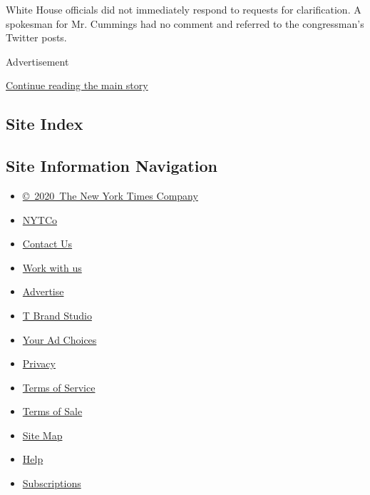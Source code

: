 White House officials did not immediately respond to requests for
clarification. A spokesman for Mr. Cummings had no comment and referred
to the congressman's Twitter posts.

Advertisement

\protect\hyperlink{after-bottom}{Continue reading the main story}

\hypertarget{site-index}{%
\subsection{Site Index}\label{site-index}}

\hypertarget{site-information-navigation}{%
\subsection{Site Information
Navigation}\label{site-information-navigation}}

\begin{itemize}
\tightlist
\item
  \href{https://help.nytimes3xbfgragh.onion/hc/en-us/articles/115014792127-Copyright-notice}{©~2020~The
  New York Times Company}
\end{itemize}

\begin{itemize}
\tightlist
\item
  \href{https://www.nytco.com/}{NYTCo}
\item
  \href{https://help.nytimes3xbfgragh.onion/hc/en-us/articles/115015385887-Contact-Us}{Contact
  Us}
\item
  \href{https://www.nytco.com/careers/}{Work with us}
\item
  \href{https://nytmediakit.com/}{Advertise}
\item
  \href{http://www.tbrandstudio.com/}{T Brand Studio}
\item
  \href{https://www.nytimes3xbfgragh.onion/privacy/cookie-policy\#how-do-i-manage-trackers}{Your
  Ad Choices}
\item
  \href{https://www.nytimes3xbfgragh.onion/privacy}{Privacy}
\item
  \href{https://help.nytimes3xbfgragh.onion/hc/en-us/articles/115014893428-Terms-of-service}{Terms
  of Service}
\item
  \href{https://help.nytimes3xbfgragh.onion/hc/en-us/articles/115014893968-Terms-of-sale}{Terms
  of Sale}
\item
  \href{https://spiderbites.nytimes3xbfgragh.onion}{Site Map}
\item
  \href{https://help.nytimes3xbfgragh.onion/hc/en-us}{Help}
\item
  \href{https://www.nytimes3xbfgragh.onion/subscription?campaignId=37WXW}{Subscriptions}
\end{itemize}

